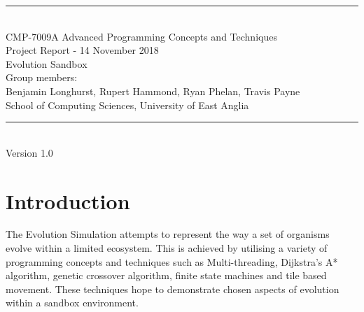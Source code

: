 \documentclass[a4paper, oneside, 11pt]{report}
\begin{document}
\begin{titlepage}
\begin{center}
\rule{12cm}{1mm} \\
\vspace{1cm}
{\large  CMP-7009A Advanced Programming Concepts and Techniques}
\vspace{7.5cm}
\\{\Large Project Report - 14 November 2018}
\vspace{1.5cm}
\\{\LARGE Evolution Sandbox}
\vspace{1.0cm}
\\{\Large Group members: \\ Benjamin Longhurst, Rupert Hammond, Ryan Phelan, Travis Payne}
\vspace{10.0cm}
\\{\large School of Computing Sciences, University of East Anglia}
\\ \rule{12cm}{0.5mm}
\\ \hspace{8.5cm} {\large Version 1.0}
\end{center}
\end{titlepage}

\setcounter{page}{1}

\begin{abstract}
	
\end{abstract}

\chapter{Introduction}
The Evolution Simulation attempts to represent the way a set of organisms evolve within a limited ecosystem. This is achieved by utilising a variety of programming concepts and techniques such as Multi-threading, Dijkstra's A* algorithm, genetic crossover algorithm, finite state machines and tile based movement. These techniques hope to demonstrate chosen aspects of evolution within a sandbox environment.
\end{document}
